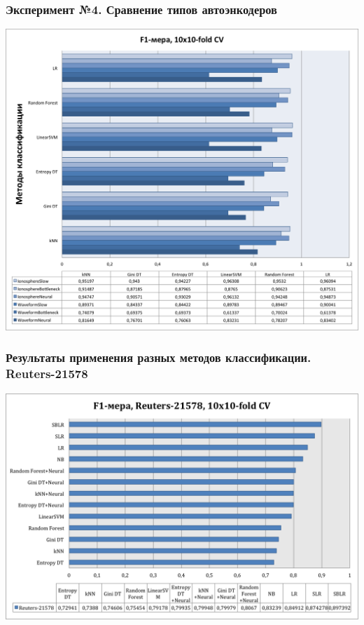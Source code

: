 \documentclass{beamer}
\begin{document}
\begin{frame}
\frametitle{Эксперимент №4. Сравнение типов автоэнкодеров}
\begin{center}
    \includegraphics[width=\linewidth,height=0.8\textheight,align=\center,trim=4 4 4 4, clip, keepaspectratio]{autoencoder-comparison.png}
\end{center}
\end{frame}

\begin{frame}
\frametitle{Результаты применения разных методов классификации. Reuters-21578}
\begin{center}
    \includegraphics[width=\linewidth,height=0.75\textheight,align=\center,trim=4 4 4 4, clip, keepaspectratio]{reuters-summary.png}
\end{center}
\end{frame}
\end{document}
